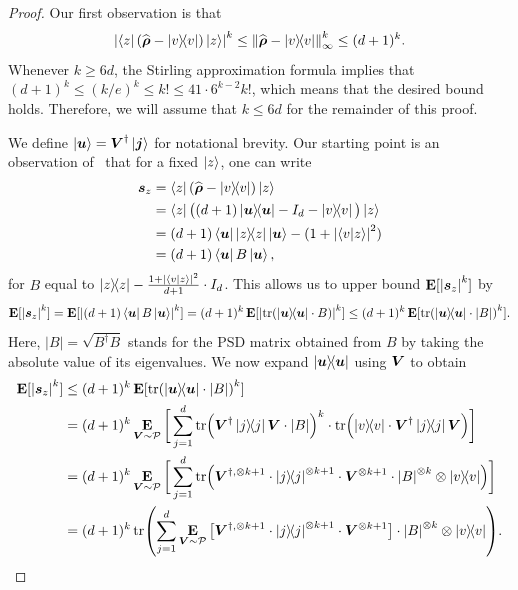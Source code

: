 \documentclass{article}
\begin{document}
\begin{proof}
    Our first observation is that
    \begin{equation*}
        \abs{\bra{z}(\widehat{\boldsymbol{\rho}} - \ketbra{v}) \ket{z}}^k \leq \norm{\widehat{\boldsymbol{\rho}} - \ketbra{v}}_{\infty}^k \leq (d+1)^k.
    \end{equation*}
    Whenever $k \geq 6d$, the Stirling approximation formula implies that $(d+1)^k \leq (k/e)^k \leq k! \leq 41 \cdot 6^{k-2}k!$, which means that the desired bound holds. Therefore, we will assume that $k \leq 6d$ for the remainder of this proof.
    
    We define $\ket{\boldsymbol{u}} = \boldsymbol{V}^{\dagger} \ket{\boldsymbol{j}}$ for notational brevity.
    Our starting point is an observation of~\cite{GKKT20} that for a fixed $\ket{z}$, one can write
    \begin{align*}
        \boldsymbol{s}_z &= \bra{z}(\widehat{\boldsymbol{\rho}} - \ketbra{v}) \ket{z} \\
        &= \bra{z}\big((d+1) \ketbra{\boldsymbol{u}} - I_d - \ketbra{v}\big) \ket{z} \\
        &= (d+1)\bra{\boldsymbol{u}} \ketbra{z} \ket{\boldsymbol{u}} - (1 + \abs{\braket{v}{z}}^2) \\
        &= (d+1)\bra{\boldsymbol{u}} B \ket{\boldsymbol{u}},
    \end{align*}
    for $B$ equal to $\ketbra{z} - \frac{1 + \abs{\braket{v}{z}}^2}{d+1} \cdot I_d$. This allows us to upper bound $\mathop{\bf E\/}[\abs{\boldsymbol{s}_z}^k]$ by
    \begin{equation*}
        \mathop{\bf E\/}[\abs{\boldsymbol{s}_z}^k] = \mathop{\bf E\/}[\abs{(d+1) \bra{\boldsymbol{u}} B \ket{\boldsymbol{u}}}^k] = (d+1)^k\mathop{\bf E\/}[\abs{\tr(\ketbra{\boldsymbol{u}} \cdot B)}^k] \leq (d+1)^k \mathop{\bf E\/}[\tr(\ketbra{\boldsymbol{u}} \cdot \abs{B})^k].
    \end{equation*}
    Here, $|B| = \sqrt{B^{\dagger}B}$ stands for the PSD matrix obtained from $B$ by taking the absolute value of its eigenvalues.
    We now expand $\ketbra{\boldsymbol{u}}$ using $\boldsymbol{V}$ to obtain
    \begin{align*}
        \E[\abs{\bs_z}^k] &\leq (d+1)^k \E[\tr(\ketbra{\bu} \cdot \abs{B})^k] \\
        &= (d+1)^k \E_{\bV \sim \mathcal{P}} \bigg[\sum_{j=1}^d \tr(\bV^{\dagger} \ketbra{j} \bV \cdot \abs{B})^k \cdot \tr(\ketbra{v} \cdot \bV^{\dagger} \ketbra{j} \bV)\bigg] \\
        &= (d+1)^k \E_{\bV \sim \mathcal{P}} \bigg[\sum_{j=1}^d \tr(\bV^{\dagger, \otimes k+1} \cdot \ketbra{j}^{\otimes k+1} \cdot \bV^{\otimes k+1} \cdot \abs{B}^{\otimes k} \otimes \ketbra{v})\bigg] \\
        &= (d+1)^k \tr(\sum_{j=1}^d \E_{\bV \sim \mathcal{P}} \big[\bV^{\dagger, \otimes k+1} \cdot \ketbra{j}^{\otimes k+1} \cdot \bV^{\otimes k+1}\big] \cdot \abs{B}^{\otimes k} \otimes \ketbra{v}).

\end{align*}
\end{proof}
\end{document}
